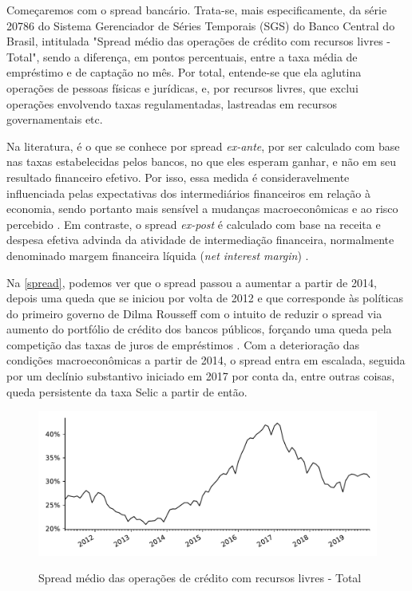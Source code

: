 \documentclass[a4paper,
               article,
               12pt,
               openany,
               oneside,
               english,
               brazil]{abntex2}
\numberwithin{equation}{section}
\begin{document}
    Começaremos com o spread bancário. Trata-se, mais especificamente, da série 20786 do Sistema Gerenciador de Séries Temporais (SGS) do Banco Central do Brasil, intitulada "Spread médio das operações de crédito com recursos livres - Total", sendo a diferença, em pontos percentuais, entre a taxa média de empréstimo e de captação no mês. Por total, entende-se que ela aglutina operações de pessoas físicas e jurídicas, e, por recursos livres, que exclui operações envolvendo taxas regulamentadas, lastreadas em recursos governamentais etc.

    Na literatura, é o que se conhece por spread \textit{ex-ante}, por ser calculado com base nas taxas estabelecidas pelos bancos, no que eles esperam ganhar, e não em seu resultado financeiro efetivo. Por isso, essa medida é consideravelmente influenciada pelas expectativas dos intermediários financeiros em relação à economia, sendo portanto mais sensível a mudanças macroeconômicas e ao risco percebido \cite[p.~226]{leal07}. Em contraste, o spread \textit{ex-post} é calculado com base na receita e despesa efetiva advinda da atividade de intermediação financeira, normalmente denominado margem financeira líquida (\textit{net interest margin}) \cite[p.~2]{almeida15}. 
    
    Na \autoref{spread}, podemos ver que o spread passou a aumentar a partir de 2014, depois uma queda que se iniciou por volta de 2012 e que corresponde às políticas do primeiro governo de Dilma Rousseff com o intuito de reduzir o spread via aumento do portfólio de crédito dos bancos públicos, forçando uma queda pela competição das taxas de juros de empréstimos \cite[p.~1]{almeida15}. Com a deterioração das condições macroeconômicas a partir de 2014, o spread entra em escalada, seguida por um declínio substantivo iniciado em 2017 por conta da, entre outras coisas, queda persistente da taxa Selic a partir de então.

    \begin{figure}[hbt]
        \centering
        \caption{Spread médio das operações de crédito com recursos livres - Total}
        \includegraphics[width=\textwidth, scale=0.75]{spread.pdf}
        \label{spread}
    \end{figure}
\end{document}
